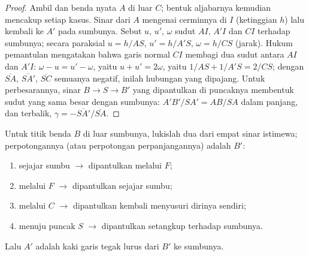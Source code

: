\begin{proof}
Ambil  dan benda nyata $A$ di luar $C$; bentuk aljabarnya
kemudian mencakup setiap kasus. Sinar dari $A$ mengenai cerminnya di $I$
(ketinggian $h$) lalu kembali ke $A'$ pada sumbunya. Sebut $u$, $u'$,
$\omega$ sudut $AI$, $A'I$ dan $CI$ terhadap sumbunya; secara paraksial
$u = h/AS$, $u' = h/A'S$, $\omega = h/CS$ (jarak). Hukum pemantulan
mengatakan bahwa garis normal $CI$ membagi dua sudut antara $AI$ dan
$A'I$: $\omega - u = u' - \omega$, yaitu $u + u' = 2\omega$, yaitu
$1/AS + 1/A'S = 2/CS$; dengan $\overline{SA}$, $\overline{SA'}$,
$\overline{SC}$ semuanya negatif, inilah hubungan yang dipajang. Untuk
perbesarannya, sinar $B \to S \to B'$ yang dipantulkan di puncaknya
membentuk sudut yang sama besar dengan sumbunya: $A'B'/SA' = AB/SA$
dalam panjang, dan  terbalik,
$\gamma = -\overline{SA'}/\overline{SA}$.
\end{proof}

\begin{method}\label{met:b1:mirrors-thin-lenses:mirrorrays}
Untuk titik benda $B$ di luar sumbunya, lukislah dua dari empat sinar
istimewa; perpotongannya (atau perpotongan perpanjangannya) adalah $B'$:
\begin{enumerate}
  \item sejajar sumbu $\to$ dipantulkan melalui $F$;
  \item melalui $F$ $\to$ dipantulkan sejajar sumbu;
  \item melalui $C$ $\to$ dipantulkan kembali menyusuri dirinya sendiri;
  \item menuju puncak $S$ $\to$ dipantulkan setangkup terhadap sumbunya.
\end{enumerate}
Lalu $A'$ adalah kaki garis tegak lurus dari $B'$ ke sumbunya.
\end{method}

